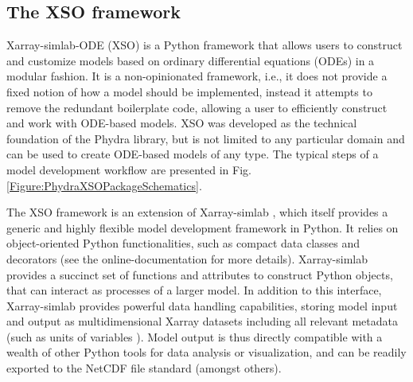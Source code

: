 \documentclass[gmd, manuscript]{copernicus}
\providecommand{\DIFadd}[1]{{\protect\color{blue}\uwave{#1}}} %
\providecommand{\DIFaddbegin}{} %
\providecommand{\DIFaddend}{} %
\begin{document}

\subsection{The XSO framework} \label{Section:XSOFramework}

Xarray-simlab-ODE (XSO) is a Python framework that allows users to construct and customize models based on ordinary differential equations (ODEs) in a modular fashion. It is a non-opinionated framework, i.e., it does not provide a fixed notion of how a model should be implemented, instead it attempts to remove the redundant boilerplate code, allowing a user to efficiently construct and work with ODE-based models. XSO was developed as the technical foundation of the Phydra library, but is not limited to any particular domain and can be used to create ODE-based models of any type. The typical steps of a model development workflow are presented in Fig. \ref{Figure:PhydraXSOPackageSchematics}.

The XSO framework is an extension of Xarray-simlab \citep{Bovy2018Xarray-simlab:Interactively, Bovy2021Benbovy/xarray-simlab:0.5.0}, which itself provides a generic and highly flexible model development framework in Python. It relies on object-oriented Python functionalities, such as compact data classes and decorators (see the online-documentation for more details). Xarray-simlab provides a succinct set of functions and attributes to construct Python objects, that can interact as processes of a larger model. In addition to this interface, Xarray-simlab provides powerful data handling capabilities, storing model input and output as multidimensional Xarray datasets \citep{Hoyer2017Xarray:Python} including all relevant metadata (such as units of variables \DIFaddbegin \DIFadd{defined within the components}\DIFaddend ). Model output is thus directly compatible with a wealth of other Python tools for data analysis or visualization, and can be readily exported to the NetCDF file standard (amongst others). 
\end{document}
